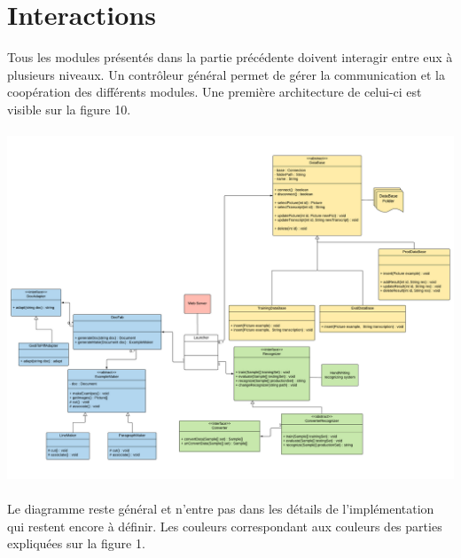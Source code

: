 \section{Interactions}

Tous les modules présentés dans la partie précédente doivent interagir entre eux à plusieurs niveaux. Un contrôleur général permet de gérer la communication et la coopération des différents modules. Une première architecture de celui-ci est visible sur la figure 10.

\paragraph{}

\begin{mdframed}[frametitle={Figure 11 : Diagramme de classes du contrôleur}, innerbottommargin=10]
\begin{center}
\includegraphics[scale=0.6]{Specifications.pdf}
\end{center}
\end{mdframed}

\paragraph{}

Le diagramme reste général et n’entre pas dans les détails de l’implémentation qui restent encore à définir. Les couleurs correspondant aux couleurs des parties expliquées sur la figure 1.

\paragraph{}


